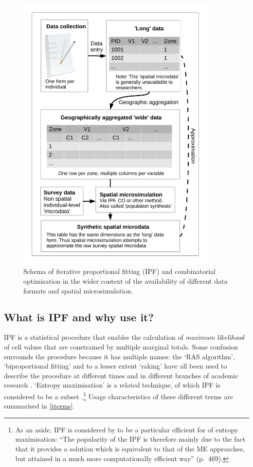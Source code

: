 \documentclass[a4paper,10pt]{article}
\begin{document}
\begin{figure}
\begin{center}
  \includegraphics[width=10cm]{msim-schema}
\end{center}

\caption{Schema of iterative proportional fitting (IPF) and combinatorial optimisation
in the wider context of the availability of different data formats and spatial microsimulation. \label{fmsim-schema}}
\end{figure}

\subsection{What is IPF and why use it?} 

IPF is a statistical procedure that enables the calculation of
\emph{maximum likelihood} of cell values that are constrained by multiple marginal totals.
Some confusion surrounds the procedure because it has multiple names:
the `RAS algorithm', `biproportional fitting' and to a lesser extent
`raking' have all been used to describe the procedure
at different times and in different branches of academic research \citep{Lahr2004}.
`Entropy maximisation' is a related technique, of which IPF is considered to be a
subset \citep{Johnston1993,Rich2012}.\footnote{As an
aside, IPF is considered by \citet{Rich2012} to be a particular
efficient for of entropy maximisation: ``The popularity of the IPF is therefore mainly due to the fact that it provides a
solution which is equivalent to that of the ME approaches, but attained in a much more
computationally efficient way'' (p.~469).
}
Usage characteristics of these different terms are summarised in \cref{tterms}.
\end{document}
